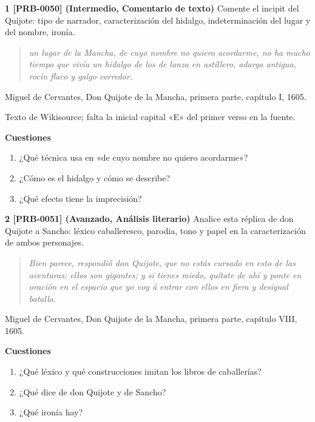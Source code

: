 \documentclass{book}
\begin{document}
\begin{tcolorbox}[title={Ejercicios}, studiumworked, breakable]

\noindent\textbf{1 [PRB-0050] (Intermedio, Comentario de texto)}
Comente el incipit del Quijote: tipo de narrador, caracterización del hidalgo, indeterminación del lugar y del nombre, ironía.


\begin{quote}
\itshape un lugar de la Mancha, de cuyo nombre no quiero acordarme, no ha mucho tiempo que vivía un hidalgo de los de lanza en astillero, adarga antigua, rocín flaco y galgo corredor.
\end{quote}
{\noindent\footnotesize Miguel de Cervantes, Don Quijote de la Mancha, primera parte, capítulo I, 1605.\par}
{\noindent\footnotesize Texto de Wikisource; falta la inicial capital «E» del primer verso en la fuente.\par}

\noindent\textbf{Cuestiones}
\begin{enumerate}
\item ¿Qué técnica usa en «de cuyo nombre no quiero acordarme»?
\item ¿Cómo es el hidalgo y cómo se describe?
\item ¿Qué efecto tiene la imprecisión?
\end{enumerate}

\noindent\textbf{2 [PRB-0051] (Avanzado, Análisis literario)}
Analice esta réplica de don Quijote a Sancho: léxico caballeresco, parodia, tono y papel en la caracterización de ambos personajes.


\begin{quote}
\itshape Bien parece, respondió don Quijote, que no estás cursado en esto de las aventuras: ellos son gigantes; y si tienes miedo, quítate de ahí y ponte en oración en el espacio que yo voy á entrar con ellos en fiera y desigual batalla.
\end{quote}
{\noindent\footnotesize Miguel de Cervantes, Don Quijote de la Mancha, primera parte, capítulo VIII, 1605.\par}

\noindent\textbf{Cuestiones}
\begin{enumerate}
\item ¿Qué léxico y qué construcciones imitan los libros de caballerías?
\item ¿Qué dice de don Quijote y de Sancho?
\item ¿Qué ironía hay?
\end{enumerate}


\end{tcolorbox}
\end{document}

